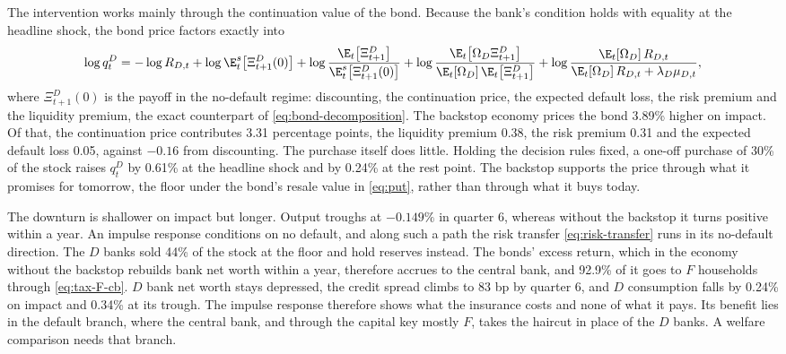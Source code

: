 The intervention works mainly through the continuation value of the bond.
Because the bank's condition holds with equality at the headline shock, the bond
price factors exactly into
\begin{equation}
\log q^{D}_t
=-\log R_{D,t}
+\log\E^{s}_t\bigl[\Xi^{D}_{t+1}(0)\bigr]
+\log\frac{\E_t\bigl[\Xi^{D}_{t+1}\bigr]}{\E^{s}_t\bigl[\Xi^{D}_{t+1}(0)\bigr]}
+\log\frac{\E_t\bigl[\Omega_{D}\Xi^{D}_{t+1}\bigr]}
          {\E_t[\Omega_{D}]\,\E_t\bigl[\Xi^{D}_{t+1}\bigr]}
+\log\frac{\E_t[\Omega_{D}]\,R_{D,t}}{\E_t[\Omega_{D}]\,R_{D,t}+\lambda_D\mu_{D,t}},
\label{eq:bond-log-decomp}
\end{equation}
where $\Xi^{D}_{t+1}(0)$ is the payoff in the no-default regime: discounting, the
continuation price, the expected default loss, the risk premium and the liquidity
premium, the exact counterpart of \eqref{eq:bond-decomposition}. The backstop
economy prices the bond 3.89\% higher on impact. Of that, the continuation price
contributes 3.31 percentage points, the liquidity premium 0.38, the risk premium
0.31 and the expected default loss 0.05, against $-0.16$ from discounting. The
purchase itself does little. Holding the decision rules fixed, a one-off purchase
of 30\% of the stock raises $q^{D}_t$ by 0.61\% at the headline shock and by
0.24\% at the rest point. The backstop supports the price through what it
promises for tomorrow, the floor under the bond's resale value in \eqref{eq:put},
rather than through what it buys today.

The downturn is shallower on impact but longer. Output troughs at $-0.149\%$ in
quarter 6, whereas without the backstop it turns positive within a year. An
impulse response conditions on no default, and along such a path the risk
transfer \eqref{eq:risk-transfer} runs in its no-default direction. The $D$ banks
sold 44\% of the stock at the floor and hold reserves instead. The bonds' excess
return, which in the economy without the backstop rebuilds bank net worth within
a year, therefore accrues to the central bank, and 92.9\% of it goes to $F$
households through \eqref{eq:tax-F-cb}. $D$ bank net worth stays depressed, the
credit spread climbs to 83 bp by quarter 6, and $D$ consumption falls by 0.24\% on
impact and 0.34\% at its trough. The impulse response therefore shows what the
insurance costs and none of what it pays. Its benefit lies in the default branch,
where the central bank, and through the capital key mostly $F$, takes the haircut
in place of the $D$ banks. A welfare comparison needs that branch.


